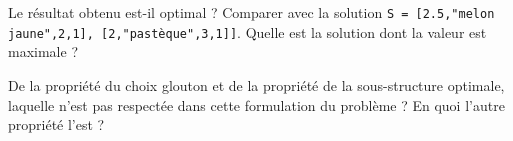\begin{question}
Le résultat obtenu est-il optimal ? Comparer avec la solution \lstinline{S = [2.5,"melon jaune",2,1], [2,"pastèque",3,1]]}. Quelle est la solution dont la valeur est maximale ?
\end{question}

\begin{question}
De la propriété du choix glouton et de la propriété de la sous-structure optimale, laquelle n’est pas respectée dans cette formulation du problème ? En quoi l’autre propriété l’est ?
\end{question}

 


